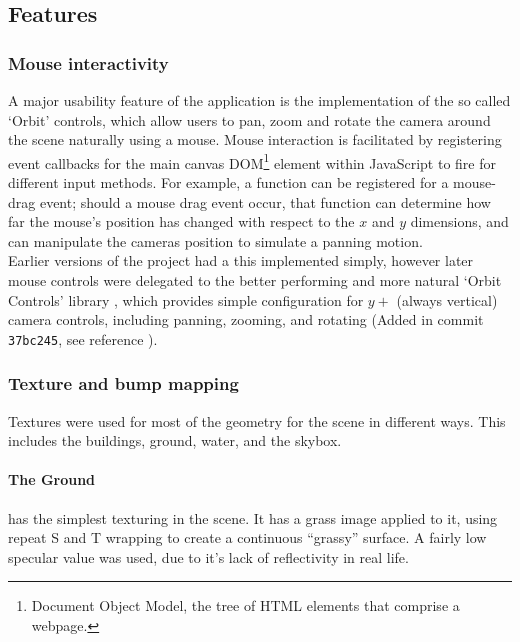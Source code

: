     \subsection{Features} %
    \label{sub:features}
        \subsubsection{Mouse interactivity} %
        \label{ssub:mouse_interactivity}
            A major usability feature of the application is the implementation of the so called `Orbit' controls, which allow users to pan, zoom and rotate the camera around the scene naturally using a mouse.
            Mouse interaction is facilitated by registering event callbacks for the main canvas DOM\footnote{Document Object Model, the tree of HTML elements that comprise a webpage.} element within JavaScript to fire for different input methods.
            For example, a function can be registered for a mouse-drag event;  should a mouse drag event occur, that function can determine how far the mouse's position has changed with respect to the $x$ and $y$ dimensions, and can manipulate the cameras position to simulate a panning motion.\\

            Earlier versions of the project had a this implemented simply, however later mouse controls were delegated to the better performing and more natural `Orbit Controls' library \cite{three_orbit}, which provides simple configuration for $y+$ (always vertical) camera controls, including panning, zooming, and rotating (Added in commit \texttt{37bc245}, see reference \cite{cranny_src}).


        \subsubsection{Texture and bump mapping} %
        \label{ssub:texture_and_bump_mapping}
            Textures were used for most of the geometry for the scene in different ways.
            This includes the buildings, ground, water, and the skybox.

            \paragraph{The Ground} %
            \label{par:the_ground}
                has the simplest texturing in the scene.
                It has a grass image applied to it, using repeat S and T wrapping to create a continuous ``grassy'' surface.
                A fairly low specular value was used, due to it's lack of reflectivity in real life.

